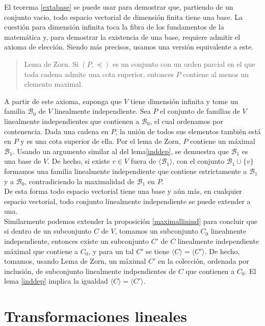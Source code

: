 \begin{obs}\label{basesinfty}
El teorema \ref{extabase} se puede usar para demostrar que, partiendo de un conjunto vacio, todo espacio vectorial de dimensi\'on finita tiene una base. La cuesti\'on para dimensi\'on infinita toca la fibra de los fundamentos de la matem\'atica y, para demostrar la existencia de una base, requiere admitir el axioma de elecci\'on. Siendo m\'as precisos, usamos una versi\'on equivalente a este.
\begin{quote}
Lema de Zorn. Si $(P,\preccurlyeq)$ es un conjunto con un orden parcial en el que toda cadena admite una cota superior, entonces $P$ contiene al menos un elemento maximal.
\end{quote}
A partir de este axioma, suponga que $V$ tiene dimensi\'on infinita y tome un familia $\mathcal{B}_0$ de $V$ linealmente independiente. Sea $P$ el conjunto de familias de $V$ linealmente independientes que contienen a $\mathcal{B}_0$, el cual ordenamos por contenencia. Dada una cadena en $P$, la uni\'on de todos sus elementos tambi\'en est\'a en $P$ y es una cota superior de ella. Por el lema de Zorn, $P$ contiene un m\'aximal $\mathcal{B}_1$. Usando un argumento similar al del lema\ref{inddep}, se demuestra que $\mathcal{B}_1$ es una base de $V$. De hecho, si existe $v\in V$ fuera de $\langle \mathcal{B}_1\rangle$, con el conjunto $\mathcal{B}_1\cup\{v\}$ formamos una familia linealmente independiente que contiene estrictamente a $\mathcal{B}_1$ y a $\mathcal{B}_0$, contradiciendo la maximalidad de $\mathcal{B}_1$ en $P$.\\
De esta forma todo espacio vectorial tiene una base y a\'un m\'as, en cualquier espacio vectorial, todo conjunto linealmente independiente se puede extender a una.\\
Similarmente podemos extender la proposici\'on \ref{maximallinind} para concluir que si dentro de un subconjunto $C$ de $V$, tomamos un subconjunto $C_0$ linealmente independiente, entonces existe un subconjunto $C'$ de $C$ linealmente independiente m\'aximal que contiene a $C_0$, y para un tal $C'$ se tiene $\langle C\rangle=\langle C'\rangle$. De hecho, tomamos, usando Lema de Zorn, un m\'aximal $C'$ en la colecci\'on, ordenada por inclusi\'on, de subconjunto linealmente indpendientes de $C$ que contienen a $C_0$. El lema \ref{inddep} implica la igualdad $\langle C\rangle=\langle C'\rangle$.
\end{obs}

\section{Transformaciones lineales}


